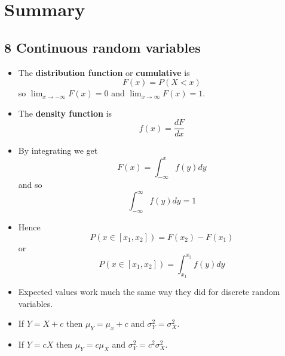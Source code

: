 
\ifind
\section*{Summary}
\else
\subsection*{8 Continuous random variables}
\fi

\begin{itemize}

\item The \textbf{distribution function} or \textbf{cumulative} is
  \begin{equation}
F(x)=P(X<x)
  \end{equation}
  so $\lim_{x\rightarrow -\infty}F(x)=0$ and $\lim_{x\rightarrow \infty}F(x)=1$.
  

\item The \textbf{density function} is
  \begin{equation}
f(x)=\frac{dF}{dx}
  \end{equation}

\item By integrating we get
  \begin{equation}
    F(x)=\int_{-\infty}^x f(y)dy
  \end{equation}
  and so
  \begin{equation}
    \int_{-\infty}^\infty f(y)dy=1
  \end{equation}

\item Hence
  \begin{equation}
P(x\in [x_1,x_2])=F(x_2)-F(x_1)
\end{equation}
or
\begin{equation}
P(x\in [x_1,x_2])=\int_{x_1}^{x_2} f(y)dy
\end{equation}

\item Expected values work much the same way they did for discrete
  random variables.

\item If $Y=X+c$ then $\mu_Y=\mu_x+c$ and $\sigma_Y^2=\sigma_X^2$.

  \item If $Y=cX$ then $\mu_Y=c\mu_X$ and $\sigma_Y^2=c^2\sigma_X^2$.

    \end{itemize}

